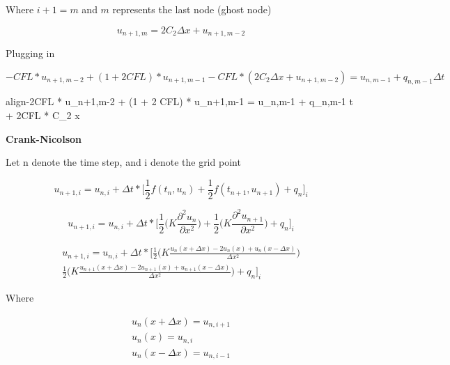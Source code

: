 \documentclass[10pt, letter, showtrims]{extarticle}
\newcommand{\boxedeq}[2]{\begin{empheq}[box={\fboxsep=6pt\fbox}]{align}\label{#1}#2\end{empheq}}
\begin{document}
    		\noindent
    		Where $i+1 = m$ and $m$ represents the last node (ghost node)
    		
    		\begin{equation}
    			u_{n+1,m} = 2 C_{2} \Delta x + u_{n+1,m-2}
    		\end{equation}
    		
    		\noindent
    		Plugging in

		\begin{equation}
			-CFL * u_{n+1,m-2} + (1 + 2 CFL) * u_{n+1,m-1} - CFL * (2 C_{2} \Delta x + u_{n+1,m-2}) = u_{n,m-1} + q_{n,m-1} \Delta t
		\end{equation}    		
    		
    		\boxedeq{}{-2CFL * u_{n+1,m-2} + (1 + 2 CFL) * u_{n+1,m-1} = u_{n,m-1} + q_{n,m-1} \Delta t + 2CFL * C_{2} \Delta x}
    		
		\pagebreak
		
		\noindent
		\textbf{Crank-Nicolson}
		
		\noindent
		Let n denote the time step, and i denote the grid point
		
		\begin{equation}
			u_{n+1,i} = u_{n,i} + \Delta t * \Big[ \frac{1}{2} f(t_{n}, u_{n}) + \frac{1}{2} f(t_{n+1}, u_{n+1}) + q_{n} \Big]_{i}
		\end{equation}
		
		\begin{equation}
			u_{n+1,i} = u_{n,i} + \Delta t * \Big[ \frac{1}{2} \big( K \frac{\partial^{2} u_{n}}{\partial x^{2}} \big) + \frac{1}{2} \big( K \frac{\partial^{2} u_{n+1}}{\partial x^{2}} \big) + q_{n} \Big]_{i}
		\end{equation}
		
		\begin{equation}
			\begin{split}
			u_{n+1,i} = u_{n,i} + \Delta t * \Big[ \frac{1}{2} \big( K \frac{u_{n}(x + \Delta x) - 2 u_{n}(x) + u_{n}(x - \Delta x)}{\Delta x^{2}} \big) \\
			 \frac{1}{2} \big( K \frac{u_{n+1}(x + \Delta x) - 2 u_{n+1}(x) + u_{n+1}(x - \Delta x)}{\Delta x^{2}} \big) + q_{n} \Big]_{i}
			\end{split}
		\end{equation}
		
		\noindent
		Where
		
		\begin{equation}
			\begin{split}
				u_{n}(x + \Delta x) = u_{n,i+1} \\
				u_{n}(x)            = u_{n,i} \\
				u_{n}(x - \Delta x) = u_{n,i-1}
			\end{split}
		\end{equation}
		
\end{document}
